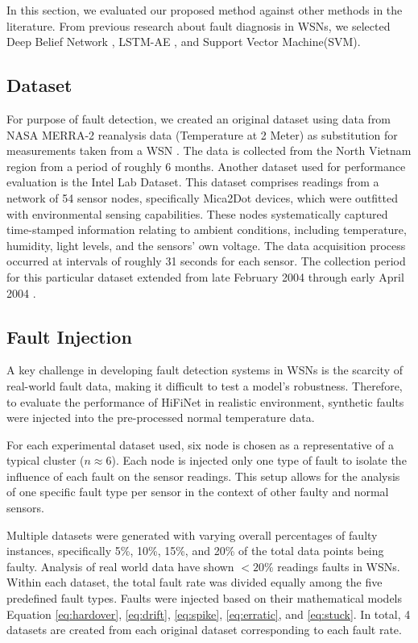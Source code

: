 In this section, we evaluated our proposed method against other methods in the literature. From previous research about fault diagnosis in WSNs, we selected  Deep Belief Network \cite{Prasad2023}, LSTM-AE \cite{Khan2024}, and Support Vector Machine(SVM).

\subsection{Dataset}
For purpose of fault detection, we created an original dataset using data from NASA MERRA-2 reanalysis data (Temperature at 2 Meter) as substitution for measurements taken from a WSN \cite{GMAO2015}. The data is collected from the North Vietnam region from a period of roughly 6 months. Another dataset used for performance evaluation is the Intel Lab Dataset. This dataset comprises readings from a network of 54 sensor nodes, specifically Mica2Dot devices, which were outfitted with environmental sensing capabilities. These nodes systematically captured time-stamped information relating to ambient conditions, including temperature, humidity, light levels, and the sensors' own voltage. The data acquisition process occurred at intervals of roughly 31 seconds for each sensor. The collection period for this particular dataset extended from late February 2004 through early April 2004 \cite{Intel2004}.

\subsection{Fault Injection}
A key challenge in developing fault detection systems in WSNs is the scarcity of real-world fault data, making it difficult to test a model's robustness. Therefore, to evaluate the performance of HiFiNet in realistic environment, synthetic faults were injected into the pre-processed normal temperature data.

For each experimental dataset used, six node is chosen as a representative of a typical cluster (\(n \approx 6\)). Each node is injected only one type of fault to isolate the influence of each fault on the sensor readings. This setup allows for the analysis of one specific fault type per sensor in the context of other faulty and normal sensors.

Multiple datasets were generated with varying overall percentages of faulty instances, specifically 5\%, 10\%, 15\%, and 20\% of the total data points being faulty. Analysis of real world data have shown \(<20\%\) readings faults in WSNs. Within each dataset, the total fault rate was divided equally among the five predefined fault types. Faults were injected based on their mathematical models Equation \ref{eq:hardover}, \ref{eq:drift}, \ref{eq:spike}, \ref{eq:erratic}, and \ref{eq:stuck}. In total, 4 datasets are created from each original dataset corresponding to each fault rate.

